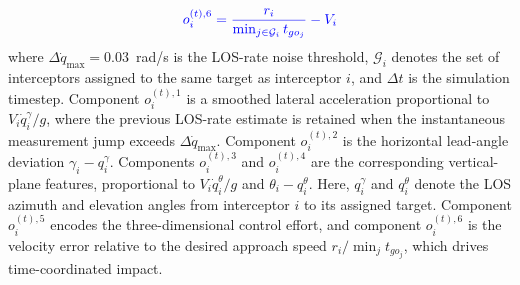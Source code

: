 \documentclass[lettersize,journal]{IEEEtran}
\newcommand{\hladd}[1]{{\color{blue}#1}}
\begin{document}
\begin{equation}
\label{eq:o6}
\hladd{
o_i^{(t),6}
=
\frac{r_i}{\min_{j\in\mathcal{G}_i}t_{go_j}}-V_i
}
\end{equation}
where $\Delta\dot{q}_{\max}=0.03$~rad/s is the LOS-rate noise threshold, $\mathcal{G}_i$ denotes the set of interceptors assigned to the same target as interceptor $i$, and $\Delta t$ is the simulation timestep. 
\hladd{Component $o_i^{(t),1}$ is a smoothed lateral acceleration proportional to $V_i\dot q_i^{\gamma}/g$, where the previous LOS-rate estimate is retained when the instantaneous measurement jump exceeds $\Delta\dot q_{\max}$.
Component $o_i^{(t),2}$ is the horizontal lead-angle deviation $\gamma_i-q_i^{\gamma}$.
Components $o_i^{(t),3}$ and $o_i^{(t),4}$ are the corresponding vertical-plane features, proportional to $V_i\dot q_i^{\theta}/g$ and $\theta_i-q_i^{\theta}$. Here, $q_i^{\gamma}$ and $q_i^{\theta}$ denote the LOS azimuth and elevation angles from interceptor $i$ to its assigned target.
Component $o_i^{(t),5}$ encodes the three-dimensional control effort, and component $o_i^{(t),6}$ is the velocity error relative to the desired approach speed $r_i/\min_j t_{go_j}$, which drives time-coordinated impact.}
\end{document}
